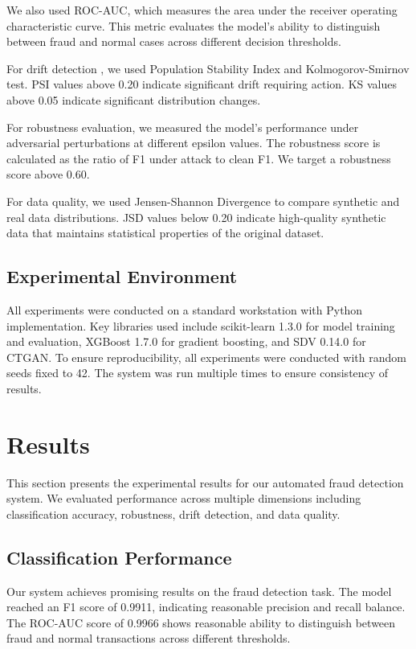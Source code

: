 \documentclass{svproc}
\begin{document}
We also used ROC-AUC, which measures the area under the receiver operating characteristic curve. This metric evaluates the model's ability to distinguish between fraud and normal cases across different decision thresholds.

For drift detection \cite{goudar2026adaptive}, we used Population Stability Index and Kolmogorov-Smirnov test. PSI values above 0.20 indicate significant drift requiring action. KS values above 0.05 indicate significant distribution changes.

For robustness evaluation, we measured the model's performance under adversarial perturbations at different epsilon values. The robustness score is calculated as the ratio of F1 under attack to clean F1. We target a robustness score above 0.60.

For data quality, we used Jensen-Shannon Divergence to compare synthetic and real data distributions. JSD values below 0.20 indicate high-quality synthetic data that maintains statistical properties of the original dataset.

\subsection{Experimental Environment}
All experiments were conducted on a standard workstation with Python implementation. Key libraries used include scikit-learn 1.3.0 for model training and evaluation, XGBoost 1.7.0 for gradient boosting, and SDV 0.14.0 for CTGAN. To ensure reproducibility, all experiments were conducted with random seeds fixed to 42. The system was run multiple times to ensure consistency of results.

\section{Results}\label{sec:results}
This section presents the experimental results for our automated fraud detection system. We evaluated performance across multiple dimensions including classification accuracy, robustness, drift detection, and data quality.

\subsection{Classification Performance}
Our system achieves promising results on the fraud detection task. The model reached an F1 score of 0.9911, indicating reasonable precision and recall balance. The ROC-AUC score of 0.9966 shows reasonable ability to distinguish between fraud and normal transactions across different thresholds.
\end{document}
